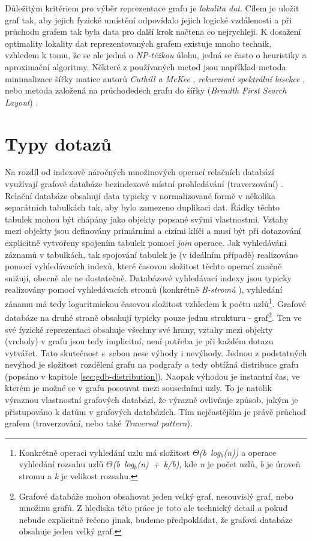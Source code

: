 Důležitým kritériem pro výběr reprezentace grafu je \textit{lokalita dat}. Cílem je uložit graf tak, aby jejich fyzické umístění odpovídalo jejich logické vzdálenosti a při průchodu grafem tak byla data pro další krok načtena co nejrychleji. K dosažení optimality lokality dat reprezentovaných grafem existuje mnoho technik, vzhledem k tomu, že se ale jedná o \textit{NP-těžkou} úlohu, jedná se často o heuristiky a aproximační algoritmy. Některé z používaných metod jsou například metoda minimalizace šířky matice autorů \textit{Cuthill a McKee} \cite{Cuthill69}, \textit{rekurzivní spektrální bisekce} \cite{Barnard93}, nebo metoda založená na průchodedech grafu do šířky (\textit{Breadth First Search Layout}) \cite{Furaih98}.


\section{Typy dotazů}
\label{sec:gdb-dotazy}

Na rozdíl od indexově náročných množinových operací relačních databází využívají grafové databáze bezindexové místní prohledávání (traverzování) \cite{Anglels08}. Relační databáze obsahují data typicky v normalizované formě v několika separátních tabulkách tak, aby bylo zamezeno duplikaci dat. Řádky těchto tabulek mohou být chápány jako objekty popsané svými vlastnostmi. Vztahy mezi objekty jsou definovány primárními a cizími klíči a musí být při dotazování explicitně vytvořeny spojením tabulek pomocí \textit{join} operace. Jak vyhledávání záznamů v tabulkách, tak spojování tabulek je (v ideálním případě) realizováno pomocí vyhledávacích indexů, které časovou složitost těchto operací značně snižují, obecně ale ne dostatečně. Databázové vyhledávací indexy jsou typicky realizovány pomocí vyhledávacích stromů (konkrétně \textit{B-stromů} \cite{Leach05}), vyhledání zánamu má tedy logaritmickou časovou složitost vzhledem k počtu uzlů\footnote{Konkrétně operaci vyhledání uzlu má složitost \textit{$\Theta$(b~log$_b$(n))} a operace vyhledání rozsahu uzlů \textit{$\Theta$(b~log$_b$(n)~+~k/b)}, kde \textit{n} je počet uzlů, \textit{b} je úroveň stromu a \textit{k} je velikost rozsahu.\cite{Cormen09}}.
Grafové databáze na druhé straně obsahují typicky pouze jednu strukturu - graf\footnote{Grafové databáže mohou obsahovat jeden velký graf, nesouvislý graf, nebo množinu grafů. Z hlediska této práce je toto ale technický detail a pokud nebude explicitně řečeno jinak, budeme předpokládat, že grafová databáze obsahuje jeden velký graf.}. Ten ve své fyzické reprezentaci obsahuje všechny své hrany, vztahy mezi objekty (vrcholy) v grafu jsou tedy implicitní, není potřeba je při každém dotazu vytvářet. Tato skutečnost s~sebou nese výhody i nevýhody. Jednou z podstatných nevýhod je složitost rozdělení grafu na podgrafy a tedy obtížná distribuce grafu (popsáno v kapitole \ref{sec:gdb-distribution}). Naopak výhodou je instantní čas, ve kterém je možné se v grafu posouvat mezi sousedními uzly. To je natolik výraznou vlastnostní grafových databází, že výrazně ovlivňuje způsob, jakým je přistupováno k datům v grafových databázích. Tím nejčastějším je právě průchod grafem (traverzování, nebo také \textit{Traversal pattern}).

